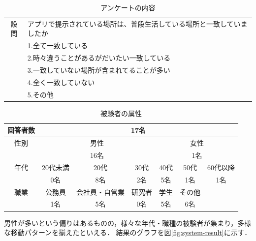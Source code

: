 \documentclass[a4paper]{jsarticle}
\begin{document}
\begin{table}[H]
  \begin{center}
    \caption{アンケートの内容}
    \renewcommand\arraystretch{1.2}
    \begin{tabular}{|c|l|}
      \hline
      設問 & \multicolumn{1}{p{12cm}|}{アプリで提示されている場所は、普段生活している場所と一致していましたか} \\
      & 1.全て一致している \\
      & 2.時々違うことがあるがだいたい一致している \\
      & 3.一致していない場所が含まれてることが多い \\
      & 4.全く一致していない \\
      & 5.その他 \\
      \hline
    \end{tabular}
    \label{tab:system-test-content}
  \end{center}
\end{table}

\begin{table}[H]
  \begin{center}
    \caption{被験者の属性}
    \renewcommand\arraystretch{1.4}
    \begin{tabular}{|c|c|c|c|c|c|c|}
      \hline
      \multicolumn{1}{|l|}{回答者数} & \multicolumn{6}{c|}{17名} \\
      \hline
      性別 & \multicolumn{3}{c|}{男性}　& \multicolumn{3}{c|}{女性} \\
      \cline{2-7}
      & \multicolumn{3}{c|}{16名}　& \multicolumn{3}{c|}{1名} \\
      \hline
      年代 & 20代未満 & 20代 & 30代 & 40代 & 50代 & 60代以降 \\
      \cline{2-7}
      & 0名 & 8名 & 2名 & 5名 & 1名 & 1名 \\
      \hline
      職業 & 公務員 & 会社員・自営業 & 研究者 & 学生 & その他 &  \\
      \cline{2-7}
      & 1名 & 5名 & 0名 & 5名 & 6名 & \\
      \hline
    \end{tabular}
    \label{tab:system-test-userstatus}
  \end{center}
\end{table}

男性が多いという偏りはあるものの，様々な年代・職種の被験者が集まり，多様な移動パターンを揃えたといえる．
結果のグラフを図\ref{fig:system-result}に示す．
\end{document}
